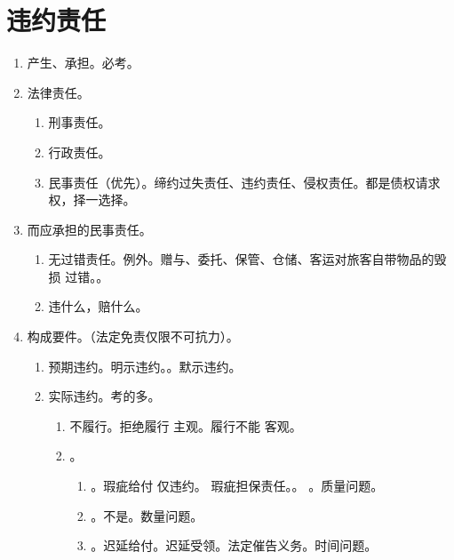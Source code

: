 \section{违约责任}
\begin{enumerate}
  \item 产生、承担。必考。
  \item 法律责任。
        \begin{enumerate}
          \item 刑事责任。
          \item 行政责任。
          \item 民事责任（优先）。缔约过失责任、违约责任、侵权责任。都是债权请求权，择一选择。
        \end{enumerate}
  \item {}而应承担的民事责任。
        \begin{enumerate}
          \item 无过错责任。例外。赠与、委托、保管、仓储、客运对旅客自带物品的毁损 \yjt 过错。。
          \item 违什么，赔什么。
        \end{enumerate}
  \item 构成要件。（法定免责仅限不可抗力）。
        \begin{enumerate}
          \item 预期违约。\yi 明示违约。。\er 默示违约。
          \item 实际违约。考的多。
                \begin{enumerate}
                  \item 不履行。拒绝履行 \yjt 主观。履行不能 \yjt 客观。
                  \item {}。
                        \begin{enumerate}
                          \item {}。\yi 瑕疵给付 \yjt 仅违约。
                                瑕疵担保责任。。
                                \er {}。质量问题。
                          \item {}。不是。数量问题。
                          \item {}。\yi 迟延给付。\er 迟延受领。法定催告义务。时间问题。
                        \end{enumerate}

\end{enumerate}
\end{enumerate}
\end{enumerate}
